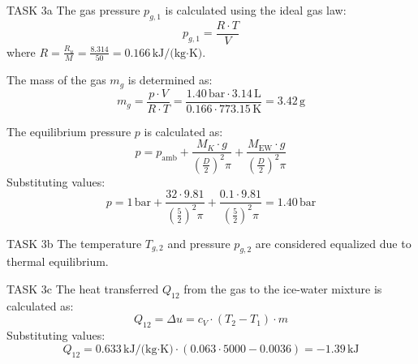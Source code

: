 TASK 3a  
The gas pressure \( p_{g,1} \) is calculated using the ideal gas law:  
\[
p_{g,1} = \frac{R \cdot T}{V}
\]  
where \( R = \frac{R_u}{M} = \frac{8.314}{50} = 0.166 \, \text{kJ/(kg·K)} \).  

The mass of the gas \( m_g \) is determined as:  
\[
m_g = \frac{p \cdot V}{R \cdot T} = \frac{1.40 \, \text{bar} \cdot 3.14 \, \text{L}}{0.166 \cdot 773.15 \, \text{K}} = 3.42 \, \text{g}
\]  

The equilibrium pressure \( p \) is calculated as:  
\[
p = p_{\text{amb}} + \frac{M_K \cdot g}{\left(\frac{D}{2}\right)^2 \pi} + \frac{M_{\text{EW}} \cdot g}{\left(\frac{D}{2}\right)^2 \pi}
\]  
Substituting values:  
\[
p = 1 \, \text{bar} + \frac{32 \cdot 9.81}{\left(\frac{5}{2}\right)^2 \pi} + \frac{0.1 \cdot 9.81}{\left(\frac{5}{2}\right)^2 \pi} = 1.40 \, \text{bar}
\]  

TASK 3b  
The temperature \( T_{g,2} \) and pressure \( p_{g,2} \) are considered equalized due to thermal equilibrium.  

TASK 3c  
The heat transferred \( Q_{12} \) from the gas to the ice-water mixture is calculated as:  
\[
Q_{12} = \Delta u = c_V \cdot (T_2 - T_1) \cdot m
\]  
Substituting values:  
\[
Q_{12} = 0.633 \, \text{kJ/(kg·K)} \cdot (0.063 \cdot 5000 - 0.0036) = -1.39 \, \text{kJ}
\]